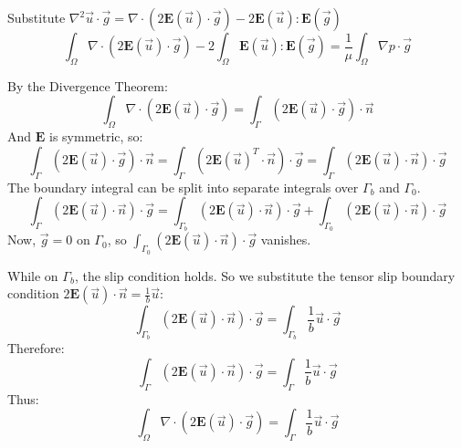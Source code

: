 \documentclass[a4paper]{report}
\begin{document}

Substitute $ \nabla^2 \vec{u} \cdot \vec{g} = \nabla \cdot ( 2 \mathbf{E}(\vec{u}) \cdot \vec{g}) - 2 \mathbf{E}(\vec{u}):\mathbf{E}(\vec{g}) $
\begin{equation}
\int_{\Omega} \nabla \cdot ( 2 \mathbf{E}(\vec{u}) \cdot \vec{g} ) - 
2 \int_{\Omega} \mathbf{E}(\vec{u}) : \mathbf{E}(\vec{g})  = 
\frac{1}{\mu} \int_{\Omega}  \nabla p \cdot \vec{g}
\end{equation}

By the Divergence Theorem:
\begin{equation}
\int_{\Omega} \nabla \cdot ( 2 \mathbf{E}(\vec{u}) \cdot \vec{g} ) =
\int_{\Gamma} ( 2 \mathbf{E}(\vec{u}) \cdot \vec{g} ) \cdot \vec{n}
\end{equation}
And $\mathbf{E}$ is symmetric, so:
\begin{equation}
\int_{\Gamma} ( 2 \mathbf{E}(\vec{u}) \cdot \vec{g} ) \cdot \vec{n} =
\int_{\Gamma} ( 2 \mathbf{E}(\vec{u})^T \cdot \vec{n} ) \cdot \vec{g} =
\int_{\Gamma} ( 2 \mathbf{E}(\vec{u}) \cdot \vec{n} ) \cdot \vec{g}
\end{equation}
The boundary integral can be split into separate integrals over $\Gamma_b$ and $\Gamma_0$.\begin{equation}
\int_{\Gamma} ( 2 \mathbf{E}(\vec{u}) \cdot \vec{n} ) \cdot \vec{g} =
\int_{\Gamma_b} ( 2 \mathbf{E}(\vec{u}) \cdot \vec{n} ) \cdot \vec{g} +
\int_{\Gamma_0} ( 2 \mathbf{E}(\vec{u}) \cdot \vec{n} ) \cdot \vec{g}
\end{equation}
Now, $\vec{g} = 0$ on $\Gamma_0$, so $ \int_{\Gamma_0} ( 2 \mathbf{E}(\vec{u}) \cdot \vec{n} ) \cdot \vec{g} $ vanishes.

While on $\Gamma_b$, the slip condition holds.
So we substitute the tensor slip boundary condition $ 2 \mathbf{E}(\vec{u}) \cdot \vec{n} = \frac{1}{b} \vec{u}$:
\begin{equation}
\int_{\Gamma_b} ( 2 \mathbf{E}(\vec{u}) \cdot \vec{n} ) \cdot \vec{g} =
\int_{\Gamma_b} \frac{1}{b} \vec{u} \cdot \vec{g}
\end{equation}
Therefore:
\begin{equation}
\int_{\Gamma} ( 2 \mathbf{E}(\vec{u}) \cdot \vec{n} ) \cdot \vec{g} =
\int_{\Gamma} \frac{1}{b} \vec{u} \cdot \vec{g}
\end{equation}
Thus:
\begin{equation}
\int_{\Omega} \nabla \cdot ( 2 \mathbf{E}(\vec{u}) \cdot \vec{g} ) =
\int_{\Gamma} \frac{1}{b} \vec{u} \cdot \vec{g}
\end{equation}
\end{document}
